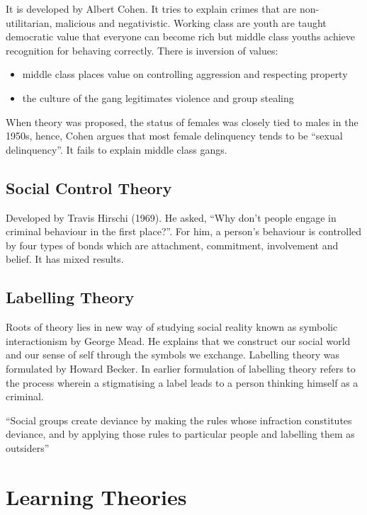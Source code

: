 \documentclass[11pt]{article}
\begin{document}
It is developed by Albert Cohen. It tries to explain crimes that are non-utilitarian, malicious and negativistic. Working class are youth are taught democratic value that everyone can become rich but middle class youths achieve recognition for behaving correctly. There is inversion of values:

\begin{itemize}
    \item middle class places value on controlling aggression and respecting property
    \item the culture of the gang legitimates violence and group stealing
\end{itemize}

When theory was proposed, the status of females was closely tied to males in the 1950s, hence, Cohen argues that most female delinquency tends to be “sexual delinquency”. It fails to explain middle class gangs.

\subsection{Social Control Theory}

Developed by Travis Hirschi (1969). He asked, “Why don’t people engage in criminal behaviour in the first place?”. For him, a person's behaviour is controlled by four types of bonds which are attachment, commitment, involvement and belief. It has mixed results.

\subsection{Labelling Theory}

Roots of theory lies in new way of studying social reality known as symbolic interactionism by George Mead. He explains that we construct our social world and our sense of self through the symbols we exchange. Labelling theory was formulated by Howard Becker. In earlier formulation of labelling theory refers to the process wherein a stigmatising a label leads to a person thinking himself as a criminal.

“Social groups create deviance by making the rules whose infraction constitutes deviance, and by applying those rules to particular people and labelling them as outsiders”

\section{Learning Theories}
\end{document}
